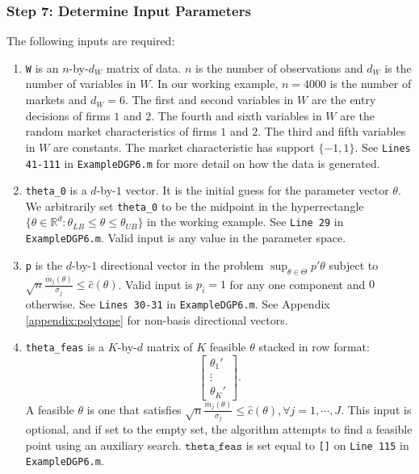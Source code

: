 \documentclass[12pt]{article}
\def\code#1{\texttt{#1}}
\begin{document}
\subsubsection*{Step 7: Determine Input Parameters}
The following inputs are required:
\begin{enumerate}
\item \code{W} is an $n$-by-$d_W$ matrix of data.  $n$ is the number of observations and $d_W$ is the number of variables in $W$.  In our working example, $n= 4000$ is the number of markets and $d_W = 6$.  The first and second variables in $W$ are the entry decisions of firms $1$ and $2$.  The fourth and sixth variables in $W$ are the random market characteristics of firms $1$ and $2$.  The third and fifth variables in $W$ are constants.  The market characteristic has support $\{-1,1\}$.  See \code{Lines 41-111} in \code{ExampleDGP6.m} for more detail on how the data is generated.

\item \code{theta\_0} is a $d$-by-$1$ vector.  It is the initial guess for the parameter vector $\theta$.  We arbitrarily set  \code{theta\_0} to be the midpoint in the hyperrectangle $\{\theta \in \mathbb{R}^d : \theta_{LB} \leq \theta \leq \theta_{UB}\}$ in the working example.  See \code{Line 29} in \code{ExampleDGP6.m}.  Valid input is any value in the parameter space.

\item \code{p} is the $d$-by-$1$ directional vector in the problem $\sup_{\theta \in \Theta} p'\theta$ subject to $\sqrt{n} \frac{ \bar m_j(\theta)}{\sigma_j} \leq \hat c(\theta)$.  Valid input is $p_i = 1$ for any one component and $0$ otherwise.  See \code{Lines 30-31} in \code{ExampleDGP6.m}.  See Appendix \ref{appendix:polytope} for non-basis directional vectors.

\item \code{theta\_feas} is a $K$-by-$d$ matrix of $K$ feasible $\theta$ stacked in row format:
\[
\begin{bmatrix} \theta_1' \\ \vdots \\ \theta_K'\end{bmatrix}.
\]
A feasible $\theta$ is one that satisfies $\sqrt{n} \frac{\bar m_j(\theta)}{\sigma_j} \leq \hat c(\theta), \forall j=1,\cdots,J$.  This input is optional, and if set to the empty set,  the algorithm attempts to find a feasible point using an auxiliary search. $\code{theta\_feas}$ is set equal to \code{[]} on \code{Line 115} in \code{ExampleDGP6.m}.


\end{enumerate}
\end{document}
